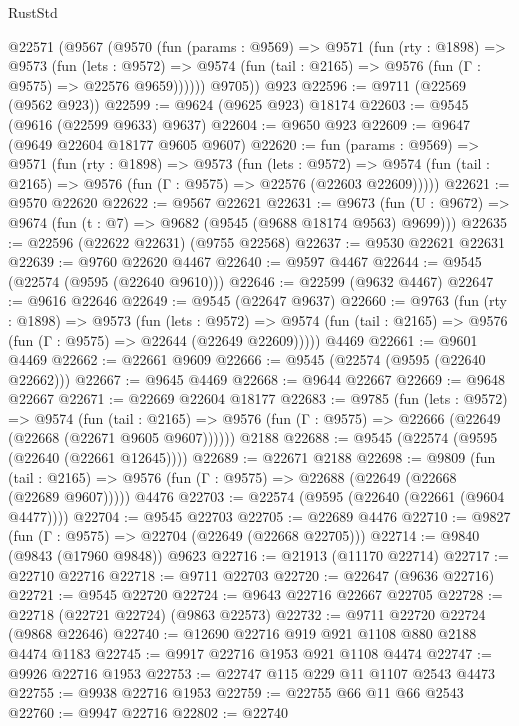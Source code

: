 \begin{lexlean}{RustStd}
\begin{coremodule}
    @22571
      (@9567
        (@9570
          (fun (params : @9569) =>
          @9571
            (fun (rty : @1898) =>
            @9573
              (fun (lets : @9572) =>
              @9574 (fun (tail : @2165) => @9576 (fun (Γ : @9575) => @22576 @9659))))))
        @9705))
    @923
@22596 := @9711 (@22569 (@9562 @923))
@22599 := @9624 (@9625 @923) @18174
@22603 := @9545 (@9616 (@22599 @9633) @9637)
@22604 := @9650 @923
@22609 := @9647 (@9649 @22604 @18177 @9605 @9607)
@22620 := fun (params : @9569) =>
  @9571
    (fun (rty : @1898) =>
    @9573
      (fun (lets : @9572) =>
      @9574 (fun (tail : @2165) => @9576 (fun (Γ : @9575) => @22576 (@22603 @22609)))))
@22621 := @9570 @22620
@22622 := @9567 @22621
@22631 := @9673
    (fun (U : @9672) => @9674 (fun (t : @7) => @9682 (@9545 (@9688 @18174 @9563) @9699)))
@22635 := @22596 (@22622 @22631) (@9755 @22568)
@22637 := @9530 @22621 @22631
@22639 := @9760 @22620 @4467
@22640 := @9597 @4467
@22644 := @9545 (@22574 (@9595 (@22640 @9610)))
@22646 := @22599 (@9632 @4467)
@22647 := @9616 @22646
@22649 := @9545 (@22647 @9637)
@22660 := @9763
    (fun (rty : @1898) =>
    @9573
      (fun (lets : @9572) =>
      @9574 (fun (tail : @2165) => @9576 (fun (Γ : @9575) => @22644 (@22649 @22609)))))
    @4469
@22661 := @9601 @4469
@22662 := @22661 @9609
@22666 := @9545 (@22574 (@9595 (@22640 @22662)))
@22667 := @9645 @4469
@22668 := @9644 @22667
@22669 := @9648 @22667
@22671 := @22669 @22604 @18177
@22683 := @9785
    (fun (lets : @9572) =>
    @9574
      (fun (tail : @2165) =>
      @9576 (fun (Γ : @9575) => @22666 (@22649 (@22668 (@22671 @9605 @9607))))))
    @2188
@22688 := @9545 (@22574 (@9595 (@22640 (@22661 @12645))))
@22689 := @22671 @2188
@22698 := @9809
    (fun (tail : @2165) => @9576 (fun (Γ : @9575) => @22688 (@22649 (@22668 (@22689 @9607)))))
    @4476
@22703 := @22574 (@9595 (@22640 (@22661 (@9604 @4477))))
@22704 := @9545 @22703
@22705 := @22689 @4476
@22710 := @9827 (fun (Γ : @9575) => @22704 (@22649 (@22668 @22705)))
@22714 := @9840 (@9843 (@17960 @9848)) @9623
@22716 := @21913 (@11170 @22714)
@22717 := @22710 @22716
@22718 := @9711 @22703
@22720 := @22647 (@9636 @22716)
@22721 := @9545 @22720
@22724 := @9643 @22716 @22667 @22705
@22728 := @22718 (@22721 @22724) (@9863 @22573)
@22732 := @9711 @22720 @22724 (@9868 @22646)
@22740 := @12690 @22716 @919 @921 @1108 @880 @2188 @4474 @1183
@22745 := @9917 @22716 @1953 @921 @1108 @4474
@22747 := @9926 @22716 @1953
@22753 := @22747 @115 @229 @11 @1107 @2543 @4473
@22755 := @9938 @22716 @1953
@22759 := @22755 @66 @11 @66 @2543
@22760 := @9947 @22716
@22802 := @22740

\end{coremodule}
\end{lexlean}
